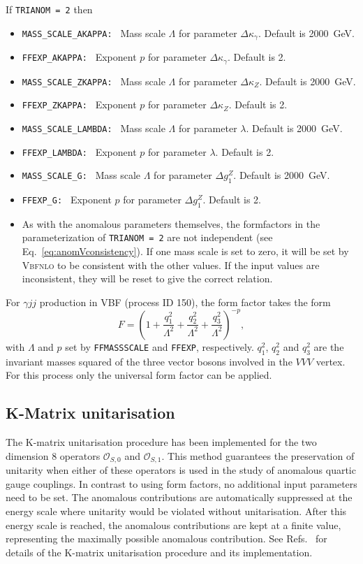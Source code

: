 \documentclass[english,12pt]{article}
\begin{document}
If {\tt TRIANOM = 2} then
\begin{itemize}
 \item {\tt MASS\_SCALE\_AKAPPA: } Mass scale $\Lambda$ for parameter $\Delta
\kappa_{\gamma}$.  Default is 2000~GeV.
 \item {\tt FFEXP\_AKAPPA: } Exponent $p$ for parameter $\Delta \kappa_{\gamma}$.  Default
is 2.
 \item {\tt MASS\_SCALE\_ZKAPPA: } Mass scale $\Lambda$ for parameter $\Delta
\kappa_{Z}$.  Default is 2000~GeV.
 \item {\tt FFEXP\_ZKAPPA: } Exponent $p$ for parameter $\Delta \kappa_{Z}$.  Default
is 2.
 \item {\tt MASS\_SCALE\_LAMBDA: } Mass scale $\Lambda$ for parameter $\lambda$.
 Default is 2000~GeV.
 \item {\tt FFEXP\_LAMBDA: } Exponent $p$ for parameter $\lambda$.  Default is
2.
 \item {\tt MASS\_SCALE\_G: } Mass scale $\Lambda$ for parameter $\Delta g_{1}^{Z}$. 
Default is 2000~GeV.
 \item {\tt FFEXP\_G: } Exponent $p$ for parameter $\Delta g_{1}^{Z}$.  Default is 2.
 \item As with the anomalous parameters themselves, the formfactors in the
parameterization of {\tt TRIANOM = 2} are not independent (see
Eq.~\eqref{eq:anomVconsistency}).  If one mass scale is set to zero, it will be
set by \textsc{Vbfnlo} to be consistent with the other values.  If the input
values are inconsistent, they will be reset to give the correct relation.
\end{itemize}

For $\gamma jj$ production in VBF (process ID 150), the form factor takes the form
\begin{equation}
 F = \left(1 + \frac{q_1^2}{\Lambda^{2}} + \frac{q_2^2}{\Lambda^{2}} + \frac{q_3^2}{\Lambda^{2}} \right)^{-p},
\end{equation}
with $\Lambda$ and $p$ set by {\tt FFMASSSCALE} and {\tt FFEXP}, respectively.
$q_1^2$, $q_2^2$ and $q_3^2$ are the invariant masses squared of the three vector bosons involved in the
$VVV$ vertex.
For this process only the universal form factor can be applied.

\subsection{K-Matrix unitarisation}
\label{sec:kmatrix}

The K-matrix unitarisation procedure has been implemented 
for the two dimension 8 operators $\mathcal{O}_{S,0}$ and $\mathcal{O}_{S,1}$. 
This method guarantees the preservation of unitarity when either of these operators is used 
in the study of anomalous quartic gauge couplings. In contrast to using form factors,
no additional input parameters need to be set. The anomalous contributions are automatically suppressed
at the energy scale where unitarity would be violated without unitarisation. After this energy scale is reached,
the anomalous contributions are kept at a finite value, representing the maximally possible anomalous contribution.
See Refs.~\cite{Kmatrix,Kilian:2014zja} for details of the K-matrix unitarisation procedure and its implementation.
\end{document}
